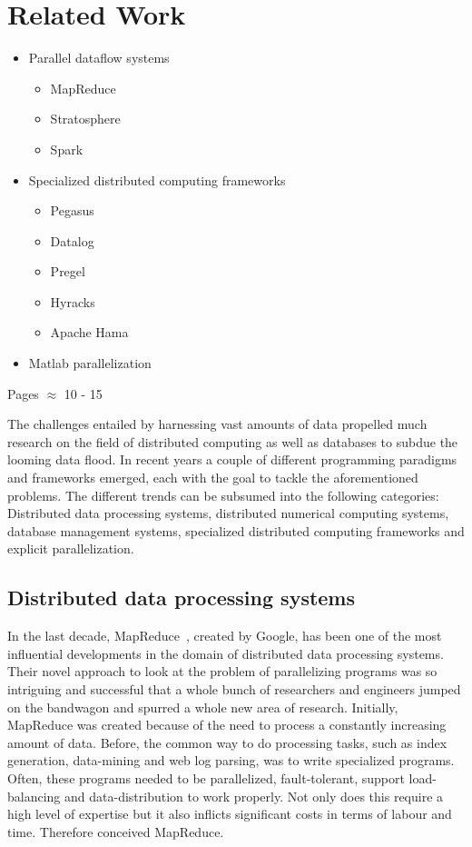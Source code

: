 \chapter{Related Work}
\label{cha:relatedwork}

\begin{itemize}
	\item Parallel dataflow systems
	\begin{itemize}
		\item MapReduce
		\item Stratosphere
		\item Spark
	\end{itemize}
	\item Specialized distributed computing frameworks
	\begin{itemize}
		\item Pegasus
		\item Datalog
		\item Pregel
		\item Hyracks
		\item Apache Hama
	\end{itemize}
	\item Matlab parallelization
\end{itemize}

Pages $\approx$ 10 - 15

The challenges entailed by harnessing vast amounts of data propelled much research on the field of distributed computing as well as databases to subdue the looming data flood.
In recent years a couple of different programming paradigms and frameworks emerged, each with the goal to tackle the aforementioned problems.
The different trends can be subsumed into the following categories: Distributed data processing systems, distributed numerical computing systems, database management systems, specialized distributed computing frameworks and explicit parallelization.

\section{Distributed data processing systems}

In the last decade, MapReduce~\cite{dean:c2008a}, created by Google, has been one of the most influential developments in the domain of distributed data processing systems.
Their novel approach to look at the problem of parallelizing programs was so intriguing and successful that a whole bunch of researchers and engineers jumped on the bandwagon and spurred a whole new area of research.
Initially, MapReduce was created because of the need to process a constantly increasing amount of data.
Before, the common way to do processing tasks, such as index generation, data-mining and web log parsing, was to write specialized programs.
Often, these programs needed to be parallelized, fault-tolerant, support load-balancing and data-distribution to work properly.
Not only does this require a high level of expertise but it also inflicts significant costs in terms of labour and time.
Therefore \textcite{dean:c2008a} conceived MapReduce.

